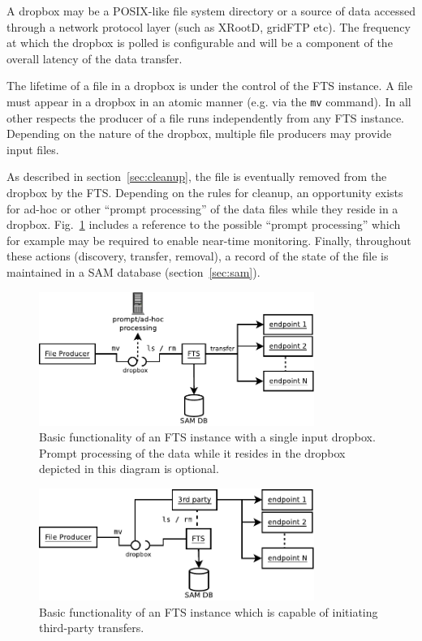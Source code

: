 \documentclass[12pt]{article}
\begin{document}
A dropbox may be a POSIX-like file system directory or a source of data accessed
through a network protocol layer (such as  XRootD, gridFTP etc). The frequency at
which the dropbox is polled is configurable and will be a component of the overall latency
of the data transfer.

The lifetime of a file in a dropbox is under the control of the FTS
instance.  A file must appear in a dropbox in an atomic manner
(e.g. via the \texttt{mv} command). In all other respects the producer
of a file runs independently from any FTS instance.  Depending on the
nature of the dropbox, multiple file producers may provide input files.


As described in section~\ref{sec:cleanup}, the file is eventually removed from the
dropbox by the FTS.  Depending on the rules for cleanup, an opportunity
exists for ad-hoc or other ``prompt processing'' of the data files while
they reside in a dropbox. Fig.~\ref{fig:ftsbasics} includes a reference to the possible
``prompt processing'' which for example may be required to enable
near-time monitoring. Finally, throughout these actions (discovery, transfer,
removal), a record of the state of the file is maintained in a SAM
database (section~\ref{sec:sam}).

\begin{figure}[tbh]
  \centering
  \includegraphics[width=0.8\textwidth]{figures/fts-basics.pdf}
  \caption{Basic functionality of an FTS instance with a single input dropbox.
Prompt processing of the data while it resides in the dropbox depicted in this diagram is optional.}
  \label{fig:ftsbasics}
\end{figure}

\begin{figure}[tbh]
  \centering
  \includegraphics[width=0.8\textwidth]{figures/fts-basics-3rd.pdf}
  \caption{Basic functionality of an FTS instance which is capable of initiating third-party transfers.}
  \label{fig:ftsbasicsthird}
\end{figure}
\end{document}
